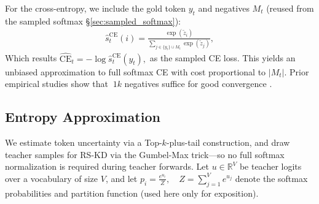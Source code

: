 \documentclass[11pt]{article}
\begin{document}
For the cross-entropy, we include the gold token $y_t$ and negatives $M_t$ (reused from the sampled softmax \S\ref{sec:sampled_softmax}):
\begin{align*}
	\hat s^{\text{CE}}_t(i) = \frac{\exp(\tilde z_i)}{\sum_{j \in \{y_t\}\cup M_t} \exp(\tilde z_j)},
\end{align*}
Which results
\(
\widehat{\text{CE}}_t = -\log \hat s^{\text{CE}}_t(y_t),
\)
as the sampled CE loss.
This yields an unbiased approximation to full softmax CE with cost proportional to $|M_t|$.
Prior empirical studies show that $~1k$ negatives suffice for good convergence \citep{blanc2018adaptive}.

\subsection{Entropy Approximation}
\label{sec:entropy}
We estimate token uncertainty via a Top-$k$-plus-tail construction, and draw teacher samples for RS-KD via the Gumbel-Max trick---so no full softmax normalization is required during teacher forwards.
Let $u \in \mathbb{R}^V$ be teacher logits over a vocabulary of size $V$, and let
$
	p_i=\frac{e^{u_i}}{Z},\quad Z=\sum_{j=1}^V e^{u_j}
$
denote the softmax probabilities and partition function (used here only for exposition).
\end{document}
